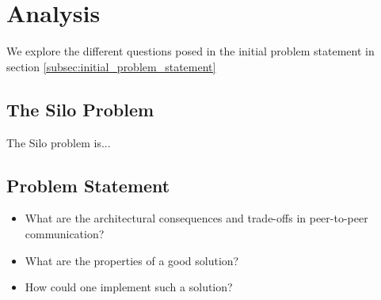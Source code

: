 \section{Analysis}
We explore the different questions posed in the initial problem statement in section \ref{subsec:initial_problem_statement}

\subsection{The Silo Problem}
The Silo problem is...


\subsection{Problem Statement}
\begin{itemize}
    \item What are the architectural consequences and trade-offs in peer-to-peer communication?
    \item What are the properties of a good solution?
    \item How could one implement such a solution?
\end{itemize}
